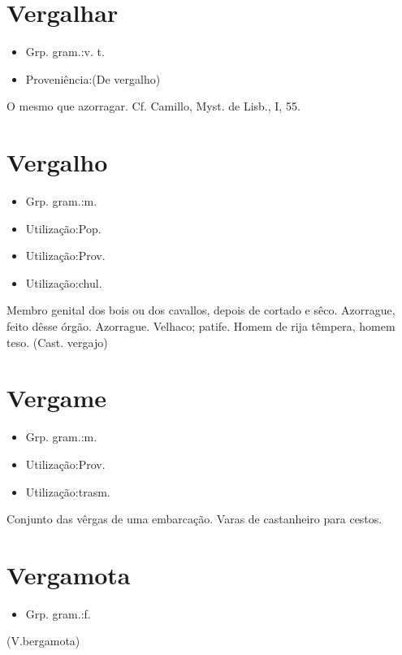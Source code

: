 \documentclass{article}
\begin{document}
\section{Vergalhar}
\begin{itemize}
\item {Grp. gram.:v. t.}
\end{itemize}
\begin{itemize}
\item {Proveniência:(De \textunderscore vergalho\textunderscore )}
\end{itemize}
O mesmo que \textunderscore azorragar\textunderscore . Cf. Camillo, \textunderscore Myst. de Lisb.\textunderscore , I, 55.
\section{Vergalho}
\begin{itemize}
\item {Grp. gram.:m.}
\end{itemize}
\begin{itemize}
\item {Utilização:Pop.}
\end{itemize}
\begin{itemize}
\item {Utilização:Prov.}
\end{itemize}
\begin{itemize}
\item {Utilização:chul.}
\end{itemize}
Membro genital dos bois ou dos cavallos, depois de cortado e sêco.
Azorrague, feito dêsse órgão.
Azorrague.
Velhaco; patife.
Homem de rija têmpera, homem teso.
(Cast. \textunderscore vergajo\textunderscore )
\section{Vergame}
\begin{itemize}
\item {Grp. gram.:m.}
\end{itemize}
\begin{itemize}
\item {Utilização:Prov.}
\end{itemize}
\begin{itemize}
\item {Utilização:trasm.}
\end{itemize}
Conjunto das vêrgas de uma embarcação.
Varas de castanheiro para cestos.
\section{Vergamota}
\begin{itemize}
\item {Grp. gram.:f.}
\end{itemize}
(V.bergamota)
\end{document}
